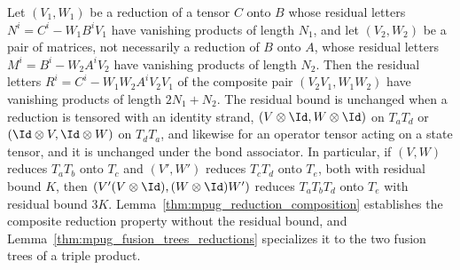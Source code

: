 \begin{lemma}%
    \label{thm:mpoalg_composite_reduction}
    \leanok
    Let $(V_1,W_1)$ be a reduction of a tensor $C$ onto $B$ whose residual
    letters $N^i=C^i-W_1B^iV_1$ have vanishing products of length $N_1$, and
    let $(V_2,W_2)$ be a pair of matrices, not necessarily a reduction of $B$
    onto $A$, whose residual letters $M^i=B^i-W_2A^iV_2$ have vanishing
    products of length $N_2$. Then the residual letters
    $R^i=C^i-W_1W_2A^iV_2V_1$ of the composite pair $(V_2V_1,W_1W_2)$ have
    vanishing products of length $2N_1+N_2$. The
    residual bound is unchanged when a reduction is tensored with an identity
    strand, $(V\otimes\Id,W\otimes\Id)$ on $T_aT_d$ or
    $(\Id\otimes V,\Id\otimes W)$ on $T_dT_a$, and likewise for an operator
    tensor acting on a state tensor, and it is unchanged under the bond
    associator. In particular, if $(V,W)$ reduces $T_aT_b$ onto $T_c$ and
    $(V',W')$ reduces $T_cT_d$ onto $T_e$, both with residual bound $K$, then
    $(V'(V\otimes\Id),(W\otimes\Id)W')$ reduces $T_aT_bT_d$ onto $T_e$ with
    residual bound $3K$. Lemma~\ref{thm:mpug_reduction_composition}
    establishes the composite reduction property without the residual bound,
    and Lemma~\ref{thm:mpug_fusion_trees_reductions} specializes it to the
    two fusion trees of a triple product.
\end{lemma}

